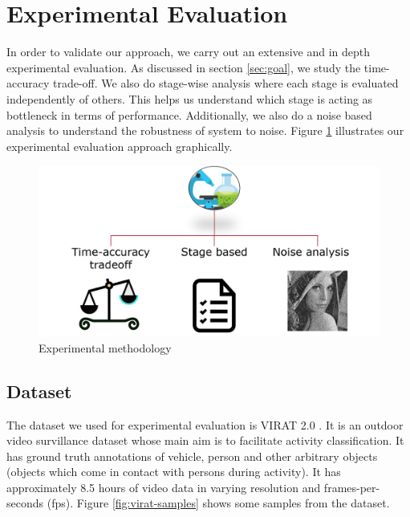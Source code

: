 \section{Experimental Evaluation}
In order to validate our approach, we carry out an extensive and in depth experimental evaluation. As discussed in section \ref{sec:goal}, we study the time-accuracy trade-off. We also do stage-wise analysis where each stage is evaluated independently of others. This helps us understand which stage is acting as bottleneck in terms of performance. Additionally, we also do a noise based analysis to understand the robustness of system to noise. Figure \ref{fig:experimental-methdology} illustrates our experimental evaluation approach graphically. 

\begin{figure}[ht]
    \centering
    \includegraphics[width=\linewidth]{images/experimental-methdology.PNG}
    \caption{Experimental methodology }
    \label{fig:experimental-methdology}
\end{figure}

\subsection{Dataset}
The dataset we used for experimental evaluation is VIRAT 2.0 \cite{virat20}. It is an outdoor video survillance dataset whose main aim is to facilitate activity classification. It has ground truth annotations of vehicle, person and other arbitrary objects (objects which come in contact with persons during activity). It has approximately 8.5 hours of video data in varying resolution and frames-per-seconds (fps). Figure \ref{fig:virat-samples} shows some samples from the dataset. 

